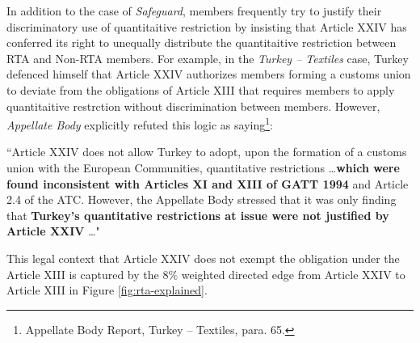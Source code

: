 In addition to the case of \textit{Safeguard}, 
members frequently try to justify their discriminatory 
use of quantitaitive restriction by insisting that Article XXIV 
has conferred its right to unequally distribute the quantitaitive restriction between RTA and Non-RTA members.
For example, in the \textit{Turkey – Textiles} case, Turkey defenced himself that Article XXIV authorizes
members forming a customs union to deviate from the obligations of Article XIII that requires members to apply quantitaitive restrction without discrimination between members. 
However, \textit{Appellate Body} explicitly refuted this logic as saying\footnote{Appellate Body Report, Turkey – Textiles, para. 65.}:
\begin{displayquote}[][]
    ``Article XXIV does not allow Turkey to adopt, upon the
    formation of a customs union with the European Communities, quantitative restrictions \ldots \textbf{which
    were found inconsistent with Articles XI and XIII of GATT 1994} and Article 2.4 of the ATC.
    However, the Appellate Body stressed that it was only finding that \textbf{Turkey's quantitative
    restrictions at issue were not justified by Article XXIV} \ldots"
\end{displayquote}
This legal context that Article XXIV does not exempt the obligation under the Article XIII is captured by the $8\%$ weighted directed edge from Article XXIV to Article XIII in Figure \ref{fig:rta-explained}.





